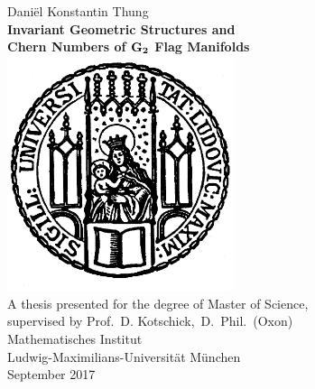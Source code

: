 \documentclass[fontsize=11pt,a4paper]{scrbook}
\begin{document}
	\frontmatter
	\begin{titlepage}
		\begin{centering}
			\vspace*{0.75cm}		
			{\LARGE\sffamily Dani\"el Konstantin Thung}\\[1.25cm]
			
			
			{\huge \sffamily\bfseries Invariant Geometric Structures and \\[0.3cm]
				Chern Numbers of $\bf G_2$ Flag Manifolds}\\[2.75cm]
			
			\includegraphics[width=0.5\textwidth]{LMUSeal.png}\\[2.75cm]
			{\large A thesis presented for the degree of
				Master of Science,\\ 
				supervised by Prof.~D. Kotschick,~D.~Phil.~(Oxon)\\[0.8cm]
				Mathematisches Institut\\
				Ludwig-Maximilians-Universit\"at M\"unchen \\ 
				September 2017\\}
		\end{centering}		
		\clearpage
	\end{titlepage}	
\end{document}
